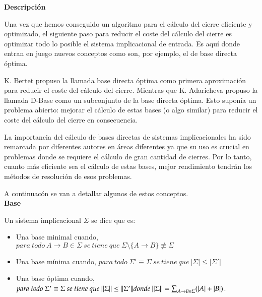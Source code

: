 \textbf{Descripci\'on} 


Una vez que hemos conseguido un algoritmo para el c\'alculo del cierre eficiente y optimizado, el siguiente paso para reducir el coste del c\'alculo del cierre es optimizar todo lo posible el sistema implicacional de entrada. Es aqu\'i donde entran en juego nuevos conceptos como son, por ejemplo, el de base directa \'optima.

K. Bertet \cite{BERTET20102155} propuso la llamada base directa \'optima como primera aproximaci\'on para reducir el coste del c\'alculo del cierre. Mientras que  K. Adaricheva \cite{Adaricheva} propuso la llamada D-Base como un subconjunto de la base directa \'optima. Esto supon\'ia un problema abierto: mejorar el c\'alculo de estas bases (o algo similar) para reducir el coste del c\'alculo del cierre en consecuencia.

La importancia del c\'alculo de bases directas de sistemas implicacionales ha sido remarcada por diferentes autores en \'areas diferentes ya que su uso es crucial en problemas donde se requiere el c\'alculo de gran cantidad de cierres. Por lo tanto, cuanto m\'as eficiente sea el c\'alculo de estas bases, mejor rendimiento tendr\'an los m\'etodos de resoluci\'on de esos problemas. 

A continuac\'on se van a detallar algunos de estos conceptos.\\


\textbf{Base}

Un sistema implicacional \( \Sigma \) se dice que es:
\begin{itemize}
    \item Una base minimal cuando,  \( para \ todo \ A \to B \in \Sigma \ se \ tiene \ que \ \Sigma \setminus \{A \to B\} \not\equiv \Sigma\)

    \item Una base m\'inima cuando,  \( para \ todo \ \Sigma' \equiv \Sigma \ se \ tiene \ que \ |\Sigma| \leq |\Sigma'|\)

    \item Una base \'optima cuando,  \( para \ todo \ \Sigma' \equiv \Sigma \ se \ tiene \ que \ \|\Sigma\| \leq \|\Sigma'\| \\ donde \ \|\Sigma\| = 
    \sum_{\substack{A \to B \in \Sigma}} (|A|+|B|) \).
\end{itemize}

